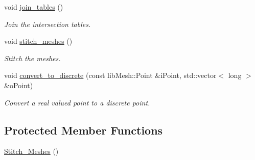 \begin{DoxyCompactItemize}
void \hyperlink{classcarl_1_1_stitch___meshes_a6bd4cd30b05f59a0f116be684232b58d}{join\+\_\+tables} ()
\begin{DoxyCompactList}\small\item\em Join the intersection tables. \end{DoxyCompactList}\item 
void \hyperlink{classcarl_1_1_stitch___meshes_aca02448f523029690eb839fc7021b3bb}{stitch\+\_\+meshes} ()
\begin{DoxyCompactList}\small\item\em Stitch the meshes. \end{DoxyCompactList}\item 
void \hyperlink{classcarl_1_1_stitch___meshes_ab99d52977f1561abb33b4cc5382c179b}{convert\+\_\+to\+\_\+discrete} (const lib\+Mesh\+::\+Point \&i\+Point, std\+::vector$<$ long $>$ \&o\+Point)
\begin{DoxyCompactList}\small\item\em Convert a real valued point to a discrete point. \end{DoxyCompactList}\end{DoxyCompactItemize}
\subsection*{Protected Member Functions}
\begin{DoxyCompactItemize}
\item 
\hyperlink{classcarl_1_1_stitch___meshes_a3b63d90fddc70f19aca449cb14ecfd30}{Stitch\+\_\+\+Meshes} ()
\end{DoxyCompactItemize}
